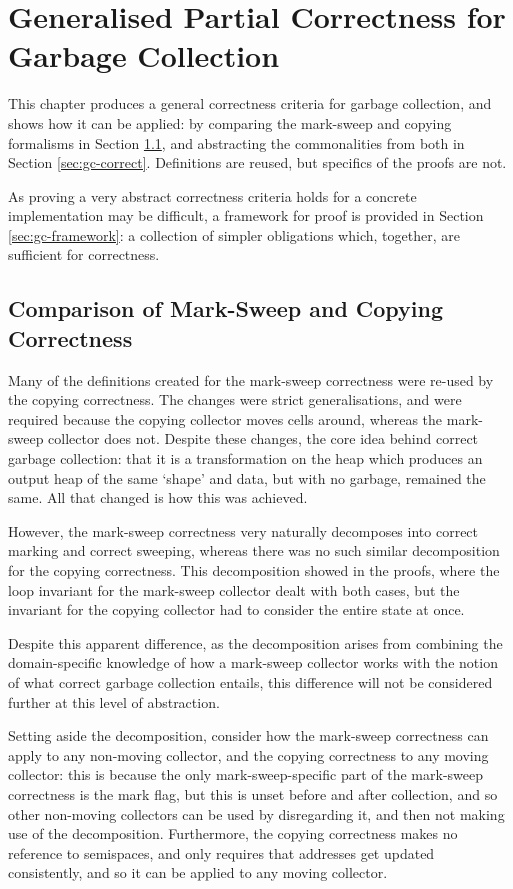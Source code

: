 \chapter{Generalised Partial Correctness for Garbage Collection}
\label{sec:gc}

This chapter produces a general correctness criteria for garbage
collection, and shows how it can be applied: by comparing the
mark-sweep and copying formalisms in Section \ref{sec:gc-comparison},
and abstracting the commonalities from both in Section
\ref{sec:gc-correct}. Definitions are reused, but specifics of the
proofs are not.

As proving a very abstract correctness criteria holds for a concrete
implementation may be difficult, a framework for proof is provided in
Section \ref{sec:gc-framework}: a collection of simpler obligations
which, together, are sufficient for correctness.

\section{Comparison of Mark-Sweep and Copying Correctness}
\label{sec:gc-comparison}

Many of the definitions created for the mark-sweep correctness were
re-used by the copying correctness. The changes were strict
generalisations, and were required because the copying collector moves
cells around, whereas the mark-sweep collector does not. Despite these
changes, the core idea behind correct garbage collection: that it is
a transformation on the heap which produces an output heap of the same
`shape' and data, but with no garbage, remained the same. All that
changed is how this was achieved.

However, the mark-sweep correctness very naturally decomposes into
correct marking and correct sweeping, whereas there was no such
similar decomposition for the copying correctness. This decomposition
showed in the proofs, where the loop invariant for the mark-sweep
collector dealt with both cases, but the invariant for the copying
collector had to consider the entire state at once.

Despite this apparent difference, as the decomposition arises from
combining the domain-specific knowledge of how a mark-sweep collector
works with the notion of what correct garbage collection entails, this
difference will not be considered further at this level of
abstraction.

Setting aside the decomposition, consider how the mark-sweep
correctness can apply to any non-moving collector, and the copying
correctness to any moving collector: this is because the only
mark-sweep-specific part of the mark-sweep correctness is the mark
flag, but this is unset before and after collection, and so other
non-moving collectors can be used by disregarding it, and then not
making use of the decomposition. Furthermore, the copying correctness
makes no reference to semispaces, and only requires that addresses get
updated consistently, and so it can be applied to any moving
collector.

